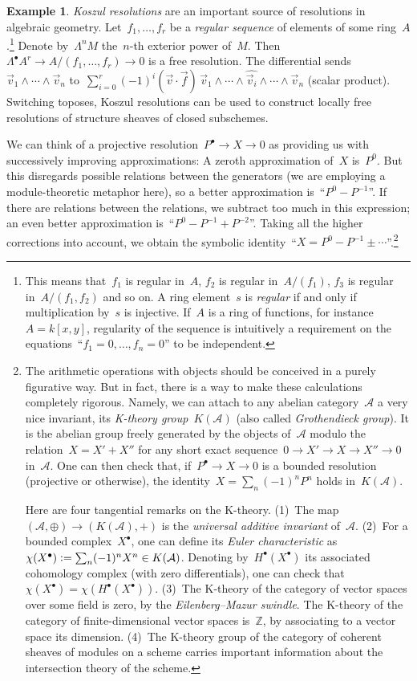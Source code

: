\documentclass{amsart}
\theoremstyle{definition}
\newtheorem{ex}[defn]{Example}
\theoremstyle{plain}
\theoremstyle{remark}
\newcommand{\ZZ}{\mathbb{Z}}
\newcommand{\A}{\mathcal{A}}
\newcommand{\?}{\,{:}\,}
\renewcommand{\_}{\mathpunct{.}\,}
\newcommand{\defeq}{\vcentcolon=}
\begin{document}
\begin{ex}\emph{Koszul resolutions} are an important source of resolutions in
algebraic geometry. Let~$f_1,\ldots,f_r$ be a \emph{regular
sequence} of elements of some ring~$A$.\footnote{This means that~$f_1$ is
regular in~$A$, $f_2$ is regular in~$A/(f_1)$, $f_3$ is regular
in~$A/(f_1,f_2)$ and so on. A ring element~$s$ is \emph{regular} if and only if
multiplication by~$s$ is injective. If~$A$ is a ring of functions, for
instance~$A = k[x,y]$, regularity of the sequence is intuitively a requirement on the
equations~``$f_1=0,\ldots,f_n=0$'' to be independent.} Denote by~$\Lambda^n M$
the~$n$-th exterior power of~$M$. Then~$\Lambda^\bullet A^r \to
A/(f_1,\ldots,f_r) \to 0$ is a free resolution. The
differential sends~$\vec v_1 \wedge \cdots \wedge \vec v_n$ to~$\sum_{i=0}^r
(-1)^i (\vec v \cdot \vec f)\, \vec v_1 \wedge \cdots \wedge \widehat{\vec v_i}
\wedge \cdots \wedge \vec v_n$ (scalar product). Switching toposes, Koszul
resolutions can be used to construct locally free resolutions of structure
sheaves of closed subschemes.
\end{ex}

We can think of a projective resolution~$P^\bullet \to X \to 0$ as providing us
with successively improving approximations: A zeroth approximation of~$X$
is~$P^0$. But this disregards possible relations between the generators (we are
employing a module-theoretic metaphor here), so a better approximation
is~``$P^0 - P^{-1}$''. If there are relations between the relations, we subtract
too much in this expression; an even better approximation is~``$P^0 - P^{-1} +
P^{-2}$''. Taking all the higher corrections into account, we obtain the
symbolic identity~``$X = P^0 - P^{-1} \pm \cdots$''.\footnote{The arithmetic
operations with objects should be conceived in a purely figurative
way. But in fact, there is a way to make these calculations completely
rigorous. Namely, we can attach to any abelian category~$\A$ a very nice
invariant, its \emph{K-theory group}~$K(\A)$ (also called \emph{Grothendieck
group}). It is the abelian group freely generated by the objects of~$\A$ modulo
the relation~$X = X' + X''$ for any short exact sequence~$0 \to X' \to X \to
X'' \to 0$ in~$\A$. One can then check that, if~$P^\bullet \to X \to 0$ is a
bounded resolution (projective or otherwise), the identity~$X = \sum_n (-1)^n
P^n$ holds in~$K(\A)$.

Here are four tangential remarks on the K-theory. (1)~The
map~$(\A,{\oplus})\to(K(\A),{+})$ is the \emph{universal additive invariant}
of~$\A$. (2)~For a bounded complex~$X^\bullet$, one can define its \emph{Euler
characteristic} as~$\chi(X^\bullet) \defeq \sum_n (-1)^n X^n \in K(\A)$.
Denoting by~$H^\bullet(X^\bullet)$ its associated cohomology complex (with zero
differentials), one can check that~$\chi(X^\bullet) =
\chi(H^\bullet(X^\bullet))$. (3)~The K-theory of the category of vector spaces
over some field is zero, by the \emph{Eilenberg--Mazur swindle}. The K-theory
of the category of finite-dimensional vector spaces is~$\ZZ$, by associating to
a vector space its dimension. (4)~The K-theory group of the category of
coherent sheaves of modules on a scheme carries important information about the
intersection theory of the scheme.}
\end{document}
